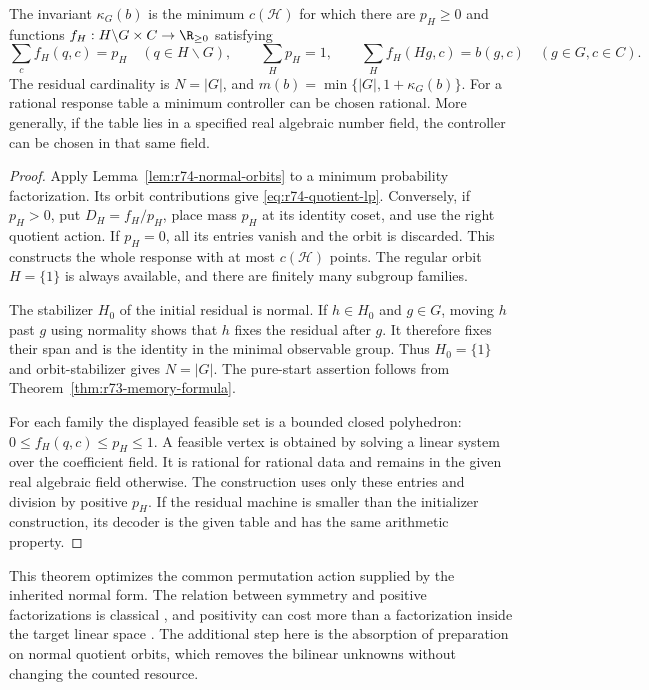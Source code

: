\begin{theorem}
\label{thm:r74-quotient-lp}
The invariant $\kappa_G(b)$ is the minimum $c(\mathcal H)$ for which there
are $p_H\ge0$ and functions
$f_H:H\backslash G\times C\to\R_{\ge0}$ satisfying
\begin{equation}\label{eq:r74-quotient-lp}
 \sum_cf_H(q,c)=p_H\quad(q\in H\backslash G),\qquad
 \sum_Hp_H=1,\qquad
 \sum_H f_H(Hg,c)=b(g,c)\quad(g\in G,c\in C).
\end{equation}
The residual cardinality is $N=|G|$, and
$m(b)=\min\{|G|,1+\kappa_G(b)\}$.
For a rational response table a minimum controller can be chosen rational.
More generally, if the table lies in a specified real algebraic number field,
the controller can be chosen in that same field.
\end{theorem}
\begin{proof}
Apply Lemma~\ref{lem:r74-normal-orbits} to a minimum probability
factorization. Its orbit contributions give \eqref{eq:r74-quotient-lp}.
Conversely, if $p_H>0$, put $D_H=f_H/p_H$, place mass $p_H$ at its identity
coset, and use the right quotient action. If $p_H=0$, all its entries vanish
and the orbit is discarded. This constructs the whole response with at
most $c(\mathcal H)$ points. The regular orbit $H=\{1\}$ is always
available, and there are finitely many subgroup families.

The stabilizer $H_0$ of the initial residual is normal. If $h\in H_0$
and $g\in G$, moving $h$ past $g$ using normality shows that $h$ fixes
the residual after $g$. It therefore fixes their span and is the identity
in the minimal observable group. Thus $H_0=\{1\}$ and orbit-stabilizer
gives $N=|G|$. The pure-start assertion follows from
Theorem~\ref{thm:r73-memory-formula}.

For each family the displayed feasible set is a bounded closed polyhedron:
$0\le f_H(q,c)\le p_H\le1$. A feasible vertex is obtained by solving a
linear system over the coefficient field. It is rational for rational data
and remains in the given real algebraic field otherwise. The construction
uses only these entries and division by positive $p_H$. If the residual
machine is smaller than the initializer construction, its decoder is the
given table and has the same arithmetic property.
\end{proof}

This theorem optimizes the common permutation action supplied by the inherited
normal form. The relation between symmetry and positive factorizations is
classical \cite{GPT13,KPT10}, and positivity can cost more than a factorization
inside the target linear space \cite{GillisGlineur12}. The additional step
here is the absorption of preparation on normal quotient orbits, which
removes the bilinear unknowns without changing the counted resource.


